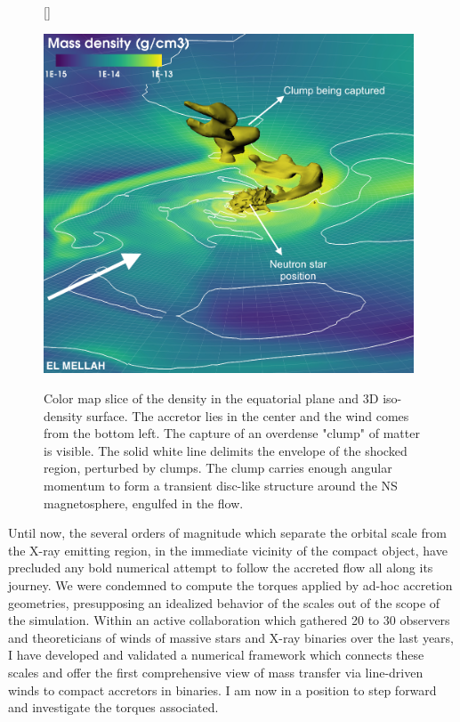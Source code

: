 \documentclass[letterpaper,12pt,onecolumn]{article}
\makeatletter
\newcommand*{\ns}{NS\@\xspace}
\makeatother
\begin{document}
\begin{figure}[!h]
\vspace*{0.3cm}
[\FBwidth]
{\caption{Color map slice of the density in the equatorial plane and 3D iso-density surface. The accretor lies in the center and the wind comes from the bottom left. The capture of an overdense "clump" of matter is visible. The solid white line delimits the envelope of the shocked region, perturbed by clumps. The clump carries enough angular momentum to form a transient disc-like structure around the \ns magnetosphere, engulfed in the flow.}\label{fig:disc}}
{\includegraphics[width=11cm]{Figures/clump_intruder.jpeg}}
\vspace*{-0.4cm}
\end{figure}

Until now, the several orders of magnitude which separate the orbital scale from the X-ray emitting region, in the immediate vicinity of the compact object, have precluded any bold numerical attempt to follow the accreted flow all along its journey. We were condemned to compute the torques applied by ad-hoc  accretion geometries, presupposing an idealized behavior of the scales out of the scope of the simulation. Within an active collaboration which gathered 20 to 30 observers and theoreticians of winds of massive stars and X-ray binaries over the last years, I have developed and validated a numerical framework which connects these scales and offer the first comprehensive view of mass transfer via line-driven winds to compact accretors in binaries. I am now in a position to step forward and investigate the torques associated.
\end{document}
